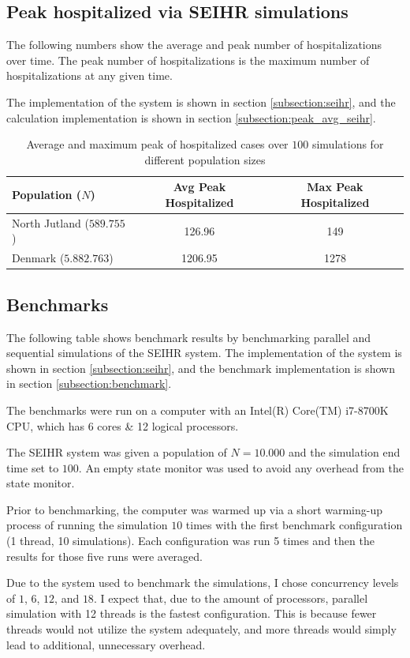 \subsection{Peak hospitalized via SEIHR simulations}
The following numbers show the average and peak number of hospitalizations over time.
The peak number of hospitalizations is the maximum number of hospitalizations at any given time.

The implementation of the system is shown in section \ref{subsection:seihr}, and the calculation implementation is shown in section \ref{subsection:peak_avg_seihr}.

\begin{table}[ht]
\centering
\begin{tabular}{|l|c|c|}
\hline
\textbf{Population ($N$)} & \textbf{Avg Peak Hospitalized} & \textbf{Max Peak Hospitalized} \\
\hline
North Jutland ($589.755$) & 126.96 & 149 \\
\hline
Denmark ($5.882.763$) & 1206.95 & 1278 \\
\hline
\end{tabular}
\caption{Average and maximum peak of hospitalized cases over $100$ simulations for different population sizes}
\end{table}

\subsection{Benchmarks}
The following table shows benchmark results by benchmarking parallel and sequential simulations of the SEIHR system.
The implementation of the system is shown in section \ref{subsection:seihr}, and the benchmark implementation is shown in section \ref{subsection:benchmark}.

The benchmarks were run on a computer with an Intel(R) Core(TM) i7-8700K CPU, which has 6 cores \& 12 logical processors.

The SEIHR system was given a population of $N=10.000$ and the simulation end time set to $100$.
An empty state monitor was used to avoid any overhead from the state monitor.

Prior to benchmarking, the computer was warmed up via a short warming-up process of running the simulation $10$ times with the first benchmark configuration (1 thread, 10 simulations).
Each configuration was run 5 times and then the results for those five runs were averaged.

Due to the system used to benchmark the simulations, I chose concurrency levels of $1$, $6$, $12$, and $18$.
I expect that, due to the amount of processors, parallel simulation with 12 threads is the fastest configuration.
This is because fewer threads would not utilize the system adequately, and more threads would simply lead to additional, unnecessary overhead.

